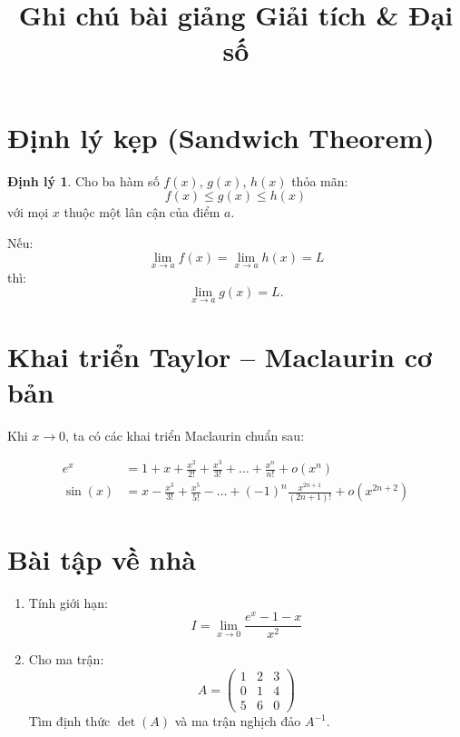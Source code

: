 \documentclass[11pt,a4paper]{article}
\title{\textbf{Ghi chú bài giảng Giải tích \& Đại số}}
\author{}
\date{}
\theoremstyle{definition}
\newtheorem{theorem}{Định lý}
\begin{document}
\maketitle

\section{Định lý kẹp (Sandwich Theorem)}

\begin{theorem}
Cho ba hàm số $f(x)$, $g(x)$, $h(x)$ thỏa mãn:
\[
f(x) \leq g(x) \leq h(x)
\]
với mọi $x$ thuộc một lân cận của điểm $a$. 

Nếu:
\[
\lim_{x \to a} f(x) = \lim_{x \to a} h(x) = L
\]
thì:
\[
\lim_{x \to a} g(x) = L.
\]
\end{theorem}

\section{Khai triển Taylor -- Maclaurin cơ bản}

Khi $x \to 0$, ta có các khai triển Maclaurin chuẩn sau:

\begin{align*}
e^x &= 1 + x + \frac{x^2}{2!} + \frac{x^3}{3!} + \dots + \frac{x^n}{n!} + o(x^n) \\
\sin(x) &= x - \frac{x^3}{3!} + \frac{x^5}{5!} - \dots + (-1)^n \frac{x^{2n+1}}{(2n+1)!} + o(x^{2n+2})
\end{align*}

\section{Bài tập về nhà}

\begin{enumerate}
    \item[\textbf{Câu 1:}] Tính giới hạn:
    \[
    I = \lim_{x \to 0} \frac{e^x - 1 - x}{x^2}
    \]

    \item[\textbf{Câu 2:}] Cho ma trận:
    \[
    A = \begin{pmatrix}
    1 & 2 & 3 \\
    0 & 1 & 4 \\
    5 & 6 & 0
    \end{pmatrix}
    \]
    Tìm định thức $\det(A)$ và ma trận nghịch đảo $A^{-1}$.
\end{enumerate}
\end{document}
